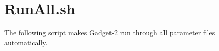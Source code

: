\section{RunAll.sh}
The following script makes Gadget-2 run through all parameter files automatically.
\begin{shstyle}

\end{shstyle}